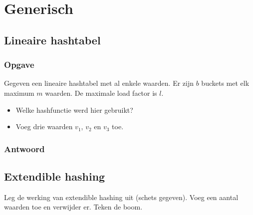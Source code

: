 \documentclass[hashing.tex]{subfiles}
\begin{document}
\chapter{Generisch}
\renewcommand\thesection{V\arabic{section}}
\renewcommand\thesubsection{V\arabic{section}}

\section{Lineaire hashtabel}
\subsection*{Opgave}
Gegeven een lineaire hashtabel met al enkele waarden. Er zijn $b$ buckets met elk maximum $m$ waarden. De maximale load factor is $l$.
\begin{itemize}
\item Welke hashfunctie werd hier gebruikt?
\item Voeg drie waarden $v_1$, $v_2$ en $v_3$ toe.
\end{itemize}
\subsection*{Antwoord}

\section{Extendible hashing}
Leg de werking van extendible hashing uit (schets gegeven). Voeg een aantal waarden toe en verwijder er. Teken de boom.
\end{document}
